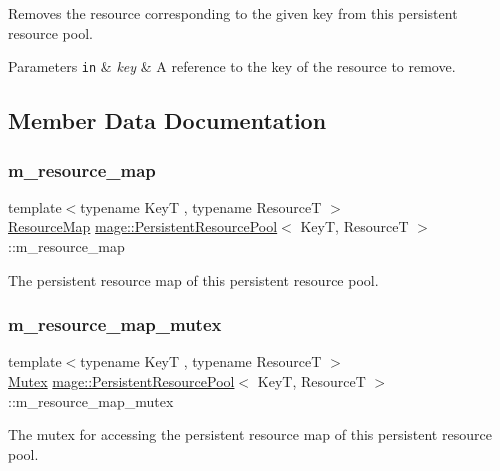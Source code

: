Removes the resource corresponding to the given key from this persistent resource pool.


\begin{DoxyParams}[1]{Parameters}
\mbox{\tt in}  & {\em key} & A reference to the key of the resource to remove. \\
\hline
\end{DoxyParams}


\subsection{Member Data Documentation}
\hypertarget{classmage_1_1_persistent_resource_pool_a9fec1e7492b5aea2a006b4e150289795}{}\label{classmage_1_1_persistent_resource_pool_a9fec1e7492b5aea2a006b4e150289795} 
\subsubsection{\texorpdfstring{m\+\_\+resource\+\_\+map}{m\_resource\_map}}
{\footnotesize\ttfamily template$<$typename KeyT , typename ResourceT $>$ \\
\hyperlink{classmage_1_1_persistent_resource_pool_a484a9df446865f7916d8fd2e560a3e18}{Resource\+Map} \hyperlink{classmage_1_1_persistent_resource_pool}{mage\+::\+Persistent\+Resource\+Pool}$<$ KeyT, ResourceT $>$\+::m\+\_\+resource\+\_\+map\hspace{0.3cm}{\ttfamily [private]}}

The persistent resource map of this persistent resource pool. \hypertarget{classmage_1_1_persistent_resource_pool_acd393008aa9fcebf06daa5ba2b8cc073}{}\label{classmage_1_1_persistent_resource_pool_acd393008aa9fcebf06daa5ba2b8cc073} 
\subsubsection{\texorpdfstring{m\+\_\+resource\+\_\+map\+\_\+mutex}{m\_resource\_map\_mutex}}
{\footnotesize\ttfamily template$<$typename KeyT , typename ResourceT $>$ \\
\hyperlink{structmage_1_1_mutex}{Mutex} \hyperlink{classmage_1_1_persistent_resource_pool}{mage\+::\+Persistent\+Resource\+Pool}$<$ KeyT, ResourceT $>$\+::m\+\_\+resource\+\_\+map\+\_\+mutex\hspace{0.3cm}{\ttfamily [private]}}

The mutex for accessing the persistent resource map of this persistent resource pool. 